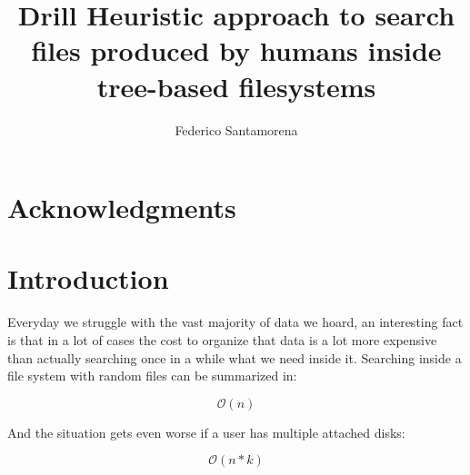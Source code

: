 \documentclass{article}
\newcommand{\bigO}{\mathcal{O}}
\begin{document}
\title
{
    Drill 
    \linebreak 
    Heuristic approach to search files produced by humans inside 
    tree-based filesystems
}
\author{Federico Santamorena}
\maketitle

\begin{abstract}
\end{abstract}


\section{Acknowledgments}


\section{Introduction}
Everyday we struggle with the vast majority of data we hoard, an interesting fact is that in a lot of cases the cost to organize that data is a lot more expensive than actually searching once in a while what we need inside it.
Searching inside a file system with random files can be summarized in:

\begin{equation}
    \label{equation_introduction}
    \bigO(n)
\end{equation}

And the situation gets even worse if a user has multiple attached disks: 

\begin{equation}
    \label{equation_disks}
    \bigO(n*k)
\end{equation}
\end{document}
